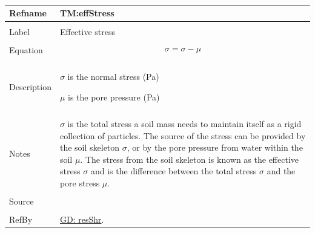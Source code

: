\documentclass[12pt]{article}
\begin{document}
~\newline
 \noindent \begin{minipage}{\textwidth}
\begin{tabular}{p{} p{}}
\toprule \textbf{Refname} & \textbf{TM:effStress}
\label{TM:effStress}
\\ \midrule \\
Label & Effective stress
        \\ \midrule \\
        Equation & \begin{dmath}
                   σ=σ-μ
                   \end{dmath}
                   \\ \midrule \\
                   Description & \begin{symbDescription}
                                 \item{$σ$ is the normal stress (Pa)}
                                 \item{$μ$ is the pore pressure (Pa)}
                                 \end{symbDescription}
                                 \\ \midrule \\
                                 Notes & $σ$ is the total stress a soil mass needs to maintain itself as a rigid collection of particles. The source of the stress can be provided by the soil skeleton $σ$, or by the pore pressure from water within the soil $μ$. The stress from the soil skeleton is known as the effective stress $σ$ and is the difference between the total stress $σ$ and the pore stress $μ$.
                                         \\ \midrule \\
                                         Source & \cite{fredlund1977}
                                                  \\ \midrule \\
                                                  RefBy & \hyperref[GD:resShr]{GD: resShr}.
\\ \bottomrule \end{tabular}
\end{minipage}\\
\end{document}

